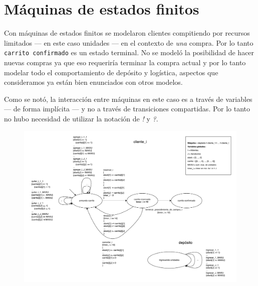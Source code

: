 \section{Máquinas de estados finitos}

Con máquinas de estados finitos se modelaron clientes compitiendo por recursos
limitados --- en este caso unidades --- en el contexto de \textit{una} compra.
Por lo tanto \texttt{carrito confirmado} es un estado terminal.
No se modeló la posibilidad de hacer nuevas compras ya que eso requeriría
terminar la compra actual y por lo tanto modelar todo el comportamiento de
depósito y logística, aspectos que consideramos ya están bien enunciados con
otros modelos.

Como se notó, la interacción entre máquinas en este caso es a través de
variables --- de forma implícita --- y no a través de transiciones compartidas.
Por lo tanto no hubo necesidad de utilizar la notación de \textit{!} y
\textit{?}.

\begin{figure}[H]
  \begin{center}
  \includegraphics[angle=90,height=\textheight]{tp2/images/fsm.pdf}
  \end{center}
\end{figure}
